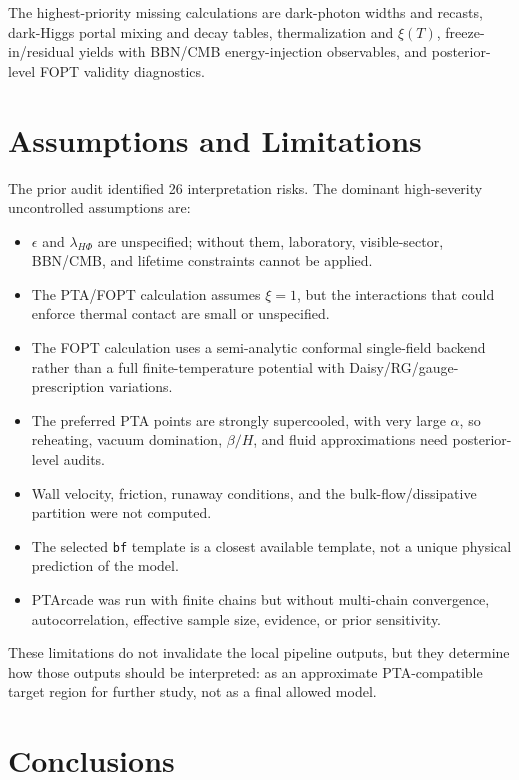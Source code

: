 \documentclass[11pt]{article}
\newcommand{\lamHP}{\lambda_{H\Phi}}
\newcommand{\eps}{\epsilon}
\begin{document}
The highest-priority missing calculations are dark-photon widths and recasts, dark-Higgs portal mixing and decay tables, thermalization and \(\xi(T)\), freeze-in/residual yields with BBN/CMB energy-injection observables, and posterior-level FOPT validity diagnostics.

\section{Assumptions and Limitations}

The prior audit identified 26 interpretation risks. The dominant high-severity uncontrolled assumptions are:
\begin{itemize}[leftmargin=1.2em]
\item \(\eps\) and \(\lamHP\) are unspecified; without them, laboratory, visible-sector, BBN/CMB, and lifetime constraints cannot be applied.
\item The PTA/FOPT calculation assumes \(\xi=1\), but the interactions that could enforce thermal contact are small or unspecified.
\item The FOPT calculation uses a semi-analytic conformal single-field backend rather than a full finite-temperature potential with Daisy/RG/gauge-prescription variations.
\item The preferred PTA points are strongly supercooled, with very large \(\alpha\), so reheating, vacuum domination, \(\beta/H\), and fluid approximations need posterior-level audits.
\item Wall velocity, friction, runaway conditions, and the bulk-flow/dissipative partition were not computed.
\item The selected \texttt{bf} template is a closest available template, not a unique physical prediction of the model.
\item PTArcade was run with finite chains but without multi-chain convergence, autocorrelation, effective sample size, evidence, or prior sensitivity.
\end{itemize}

These limitations do not invalidate the local pipeline outputs, but they determine how those outputs should be interpreted: as an approximate PTA-compatible target region for further study, not as a final allowed model.

\section{Conclusions}
\end{document}
